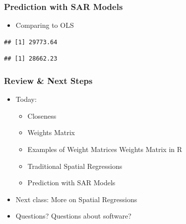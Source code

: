 \documentclass[
  shownotes,
  xcolor={svgnames},
  hyperref={colorlinks,citecolor=DarkBlue,linkcolor=DarkRed,urlcolor=DarkBlue}
  ]{beamer}
\newenvironment{Shaded}{\begin{snugshade}}{\end{snugshade}}
\newcommand{\DecValTok}[1]{\textcolor[rgb]{0.00,0.00,0.81}{#1}}
\newcommand{\KeywordTok}[1]{\textcolor[rgb]{0.13,0.29,0.53}{\textbf{#1}}}
\newcommand{\NormalTok}[1]{#1}
\newcommand{\OperatorTok}[1]{\textcolor[rgb]{0.81,0.36,0.00}{\textbf{#1}}}
\begin{document}
\begin{frame}[fragile]
\frametitle{Prediction with SAR Models}

\begin{itemize}
  \item Comparing to OLS
\end{itemize}

\begin{Shaded}
\end{Shaded}

\begin{verbatim}
## [1] 29773.64
\end{verbatim}

\begin{Shaded}
\end{Shaded}

\begin{verbatim}
## [1] 28662.23
\end{verbatim}

\end{frame}
\begin{frame}

\frametitle{Review \& Next Steps}
  
  \begin{itemize} 
    \item Today:
    \medskip
    \begin{itemize} 
        \item Closeness
        \medskip
        \item Weights Matrix
        \medskip
        \item Examples of Weight Matrices Weights Matrix in R
        \medskip
        \item Traditional Spatial Regressions
        \medskip
        \item Prediction with SAR Models
      \end{itemize}
  	\bigskip  

	\item  Next class: More on Spatial Regressions


\bigskip  
\item Questions? Questions about software? 

\end{itemize}
\end{frame}
\end{document}
